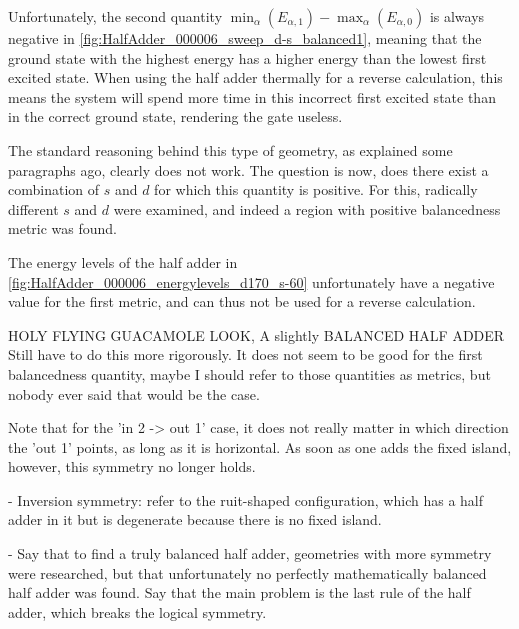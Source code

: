 \documentclass[11pt,a4paper,english]{article}
\begin{document}

Unfortunately, the second quantity $\min_\alpha(E_{\alpha,1}) - \max_\alpha(E_{\alpha,0})$ is always negative in \cref{fig:HalfAdder_000006_sweep_d-s_balanced1}, meaning that the ground state with the highest energy has a higher energy than the lowest first excited state. When using the half adder thermally for a reverse calculation, this means the system will spend more time in this incorrect first excited state than in the correct ground state, rendering the gate useless. 

The standard reasoning behind this type of geometry, as explained some paragraphs ago, clearly does not work. The question is now, does there exist a combination of $s$ and $d$ for which this quantity is positive. For this, radically different $s$ and $d$ were examined, and indeed a region with positive balancedness metric was found.

The energy levels of the half adder in \cref{fig:HalfAdder_000006_energylevels_d170_s-60} unfortunately have a negative value for the first metric, and can thus not be used for a reverse calculation.




HOLY FLYING GUACAMOLE
LOOK, A slightly BALANCED HALF ADDER
Still have to do this more rigorously.
It does not seem to be good for the first balancedness quantity, maybe I should refer to those quantities as metrics, but nobody ever said that would be the case.


Note that for the 'in 2 -> out 1' case, it does not really matter in which direction the 'out 1' points, as long as it is horizontal. As soon as one adds the fixed island, however, this symmetry no longer holds.

- Inversion symmetry: refer to the ruit-shaped configuration, which has a half adder in it but is degenerate because there is no fixed island.

- Say that to find a truly balanced half adder, geometries with more symmetry were researched, but that unfortunately no perfectly mathematically balanced half adder was found. Say that the main problem is the last rule of the half adder, which breaks the logical symmetry.

\clearpage
\end{document}

